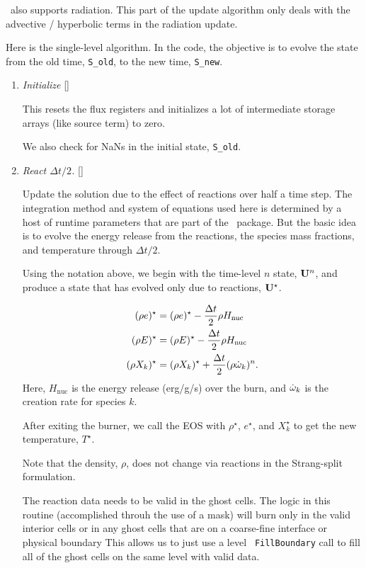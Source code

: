 \castro\ also supports radiation.  This part of the update algorithm
only deals with the advective / hyperbolic terms in the radiation update.

Here is the single-level algorithm.  In the code, the objective is to
evolve the state from the old time, {\tt S\_old}, to the new time,
{\tt S\_new}.  

\begin{enumerate}
\item \label{strang:init} {\em Initialize} []

  This resets the flux registers and initializes a lot of intermediate
  storage arrays (like source term) to zero.

  We also check for NaNs in the initial state, {\tt S\_old}.

\item {\em React $\Delta t/2$.} []

  Update the solution due to the effect of reactions over half a time
  step.  The integration method and system of equations used here is
  determined by a host of runtime parameters that are part of the
  \microphysics\ package.  But the basic idea is to evolve the energy
  release from the reactions, the species mass fractions, and
  temperature through $\Delta t/2$.

  Using the notation above, we begin with the time-level $n$ state,
  ${\bf U}^n$, and produce a state that has evolved only due to reactions,
  ${\bf U}^\star$.

  \begin{align}
    (\rho e)^\star &= (\rho e)^\star - \frac{\Delta t}{2} \rho H_\mathrm{nuc} \\
    (\rho E)^\star &= (\rho E)^\star - \frac{\Delta t}{2} \rho H_\mathrm{nuc} \\
    (\rho X_k)^\star &= (\rho X_k)^\star + \frac{\Delta t}{2}(\rho\dot\omega_k)^n.
  \end{align}
  Here, $H_\mathrm{nuc}$ is the energy release (erg/g/s) over the
  burn, and $\dot\omega_k$ is the creation rate for species $k$.

  After exiting the burner, we call the EOS with $\rho^\star$,
  $e^\star$, and $X_k^\star$ to get the new temperature, $T^\star$.

  Note that the density, $\rho$, does not change via reactions in the
  Strang-split formulation.

  The reaction data needs to be valid in the ghost cells.  The logic
  in this routine (accomplished throuh the use of a mask) will burn
  only in the valid interior cells or in any ghost cells that are on a
  coarse-fine interface or physical boundary  This allows us to just use a level {\tt
    FillBoundary} call to fill all of the ghost cells on the same
  level with valid data.


\end{enumerate}
